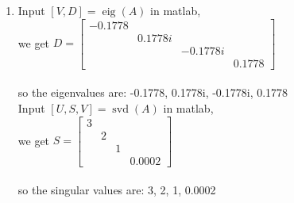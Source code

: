 \documentclass[english,onecolumn]{IEEEtran}
\begin{document}
\begin{enumerate}
	\item
	Input $[V, D]=\operatorname{eig}(A)$ in matlab,\\
	we get $D=\left[\begin{array}{cccc}-0.1778 & & & \\ & 0.1778 i & & \\ & & -0.1778 i & \\ & & & 0.1778\end{array}\right]$\\\\
	so the eigenvalues are: -0.1778, 0.1778i, -0.1778i, 0.1778\\
	Input $[U,S,V]=\operatorname{svd}(A)$ in matlab,\\
	we get $S=\left[\begin{array}{llll}3 & & \\ & 2 & \\ & & 1 \\ & & & 0.0002\end{array}\right]$\\\\
	so the singular values are: 3, 2, 1, 0.0002\\
	

\end{enumerate}
\end{document}
